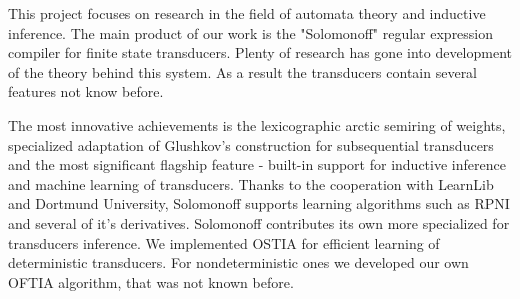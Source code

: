 
This project focuses on research in the field of automata theory and inductive inference.  The main product of our work is the "Solomonoff" regular expression compiler for finite state transducers. Plenty of research has gone into development of the theory behind this system. As a result the transducers contain several features not know before. 

The most innovative achievements is the lexicographic arctic semiring of weights, specialized adaptation of Glushkov's construction for subsequential transducers and the most significant flagship feature - built-in support for inductive inference and machine learning of transducers. Thanks to the cooperation with LearnLib and Dortmund University, Solomonoff supports learning algorithms such as RPNI and several of it's  derivatives. Solomonoff contributes its own more specialized for transducers inference. We implemented OSTIA for efficient learning of deterministic transducers. For nondeterministic ones we developed our own OFTIA algorithm, that was not known before. 

